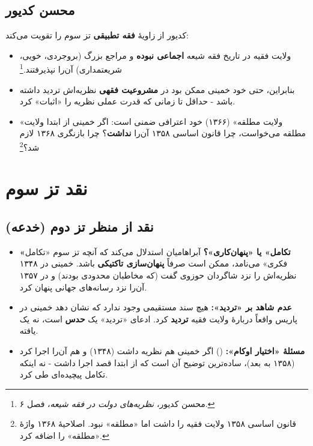 \documentclass[12pt,a4paper]{book}
\newcommand{\keyword}[1]{\textbf{\textcolor{cPrimary}{#1}}}
\newcommand{\en}[1]{\lr{\textit{#1}}}
\begin{document}
\subsection{محسن کدیور}

کدیور از زاویهٔ \keyword{فقه تطبیقی} تز سوم را تقویت می‌کند:

\begin{itemize}[label=\textcolor{cPrimary}{$\blacktriangleright$}, rightmargin=2em]
    \item ولایت فقیه در تاریخ فقه شیعه \keyword{اجماعی نبوده} و مراجع بزرگ (بروجردی، خویی، شریعتمداری) آن‌را نپذیرفتند.\footnote{محسن کدیور، \textit{نظریه‌های دولت در فقه شیعه}، فصل ۶.}
    \item بنابراین، حتی خود خمینی ممکن بود در \keyword{مشروعیت فقهی} نظریه‌اش تردید داشته باشد - حداقل تا زمانی که قدرت عملی نظریه را «اثبات» کرد.
    \item «ولایت مطلقه» (۱۳۶۶) خود اعترافی ضمنی است: اگر خمینی از ابتدا ولایت مطلقه می‌خواست، چرا قانون اساسی ۱۳۵۸ آن‌را \keyword{نداشت}؟ چرا بازنگری ۱۳۶۸ لازم شد؟\footnote{قانون اساسی ۱۳۵۸ ولایت فقیه را داشت اما «مطلقه» نبود. اصلاحیهٔ ۱۳۶۸ واژهٔ «مطلقه» را اضافه کرد.}
\end{itemize}

\section{نقد تز سوم}

\subsection{نقد از منظر تز دوم (خدعه)}

\begin{itemize}[label=\textcolor{cAccent}{$\times$}, rightmargin=2em]
    \item \textbf{«تکامل» یا «پنهان‌کاری»؟} آبراهامیان استدلال می‌کند که آنچه تز سوم «تکامل فکری» می‌نامد، ممکن است صرفاً \keyword{پنهان‌سازی تاکتیکی} باشد. خمینی در ۱۳۴۸ نظریه‌اش را نزد شاگردان حوزوی گفت (که مخاطبان محدودی بودند) و در ۱۳۵۷ آن‌را نزد رسانه‌های جهانی پنهان کرد.
    \item \textbf{عدم شاهد بر «تردید»:} هیچ سند مستقیمی وجود ندارد که نشان دهد خمینی در پاریس واقعاً دربارهٔ ولایت فقیه \keyword{تردید} کرد. ادعای «تردید» یک \keyword{حدس} است، نه یک یافته.
    \item \textbf{مسئلهٔ «اختیار اوکام»:} (\en{Occam's Razor}) اگر خمینی هم نظریه داشت (۱۳۴۸) و هم آن‌را اجرا کرد (۱۳۵۸ به بعد)، ساده‌ترین توضیح آن است که از ابتدا قصد اجرا داشت - نه اینکه تکامل پیچیده‌ای طی کرد.
\end{itemize}
\end{document}
